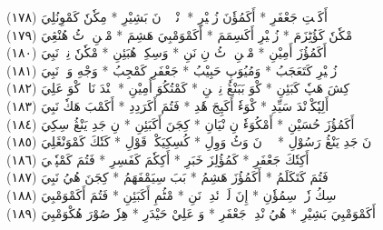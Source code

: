 \documentclass[a4paper, 10pt]{report}
\begin{document}
\begin{center}
\textarabic{(١٧٨) \textcolor{mygreen}{أَكَكٖتِ جَعْفَرِ  * أَكَمُؤٗنَ زُبٖيْرِ  * وٖنْدٖمٖنٖ نَ بَشِيْرِ  * مِكٗنٗ كَمْوِنُلِيَ }} 
\\[5mm] 

\textarabic{(١٧٩) \textcolor{mygreen}{مْكٗنٗ كَؤُٹِزَمَ  * زُبٖيْرِ أَكَسِمَمَ  * أَكَمْوَمْبِيَ هَشِمَ  * مْڠٖنِ وٖٹُ هُنْڠِيَ }} 
\\[5mm] 

\textarabic{(١٨٠) \textcolor{mygreen}{أَكَمُؤُزَ أَمِيْنِ  * مْڠٖنِ وٖٹُ نِ نَنِ  * وَسِكِيٖ هُبَئِنِ  * مْكٗنٗ نِپٖ نَبِيَ }} 
\\[5mm] 

\textarabic{(١٨١) \textcolor{mygreen}{زُبٖيْرِ كَتَعَجَبُ  * وَمُيُوَپِ حَبِيْبُ  * جَعْفَرِ كَمْجِبُ  * وَجْهِ وَكٖ نَبِيَ }} 
\\[5mm] 

\textarabic{(١٨٢) \textcolor{mygreen}{كِشَ هَپٗ كَبَئِنِ  * كْوَ بَبَنْڠُ نِپٖكٖنِ  * كَمْتُكُوَ أَمِيْنِ  * كٖنْدَ نَاءٖ كْوَ عَلِيَ }} 
\\[5mm] 

\textarabic{(١٨٣) \textcolor{mygreen}{أَلِپٗكْوٖنْدَ سَيِّدِ  * كْوَءٗ أَكَپِجَ هٗدِ  * فَتُمَ أَكَرَدِدِ  * أَكَمْبَ هَكٗ نَبِيَ }} 
\\[5mm] 

\textarabic{(١٨٤) \textcolor{mygreen}{أَكَمُؤُزَ حُسَيْنِ  * أَمْكُوَءٗ نِ نْيَانِ  * كِجَنَ أَكَبَئِنِ  * نِ جَدِ يَنْڠُ سِكِيَ }} 
\\[5mm] 

\textarabic{(١٨٥) \textcolor{mygreen}{نَ جَدِ يَنْڠُ رَسُوْلِ  * يٖيٖ نَ وَٹُ وَوِلِ  * كُسِكِيَكْوٖ قَوْلِ  * كَتٗكَ كَمْوَنْڠَلِيَ }} 
\\[5mm] 

\textarabic{(١٨٦) \textcolor{mygreen}{أَكِتٗكَ جَعْفَرِ  * كَمُؤُلِزَ خَبَرِ  * أَكِكٗمَ كَفَسِرِ  * فَتُمَ كَمْپٗكٖيَ }} 
\\[5mm] 

\textarabic{(١٨٧) \textcolor{mygreen}{فَتُمَ كَتَكَلَمُ  * أَكَمُؤُزَ هَشِمُ  * بَبَ سِيَمْفَهَمُ  * كِجَنَ هُيُ نَبِيَ }} 
\\[5mm] 

\textarabic{(١٨٨) \textcolor{mygreen}{سِكُ زٗتٖ سِمُؤٗنِ  * إِنَ لَكٖ نٔدِيٖ نَنِ  * مْٹُمِ أَكَبَئِنِ  * فَتُمَ أَكَمْوَمْبِيَ }} 
\\[5mm] 

\textarabic{(١٨٩) \textcolor{mygreen}{أَكَمْوَمْبِيَ بَشِيْرِ  * هُيُ نْدِيٖ جَعْفَرِ  * وَ عَلِيْ حَيْدَرِ  * هِزٗ صُوْرَ هُكْوَمْبِيَ }} 
\\[5mm] 


\end{center}
\end{document}
